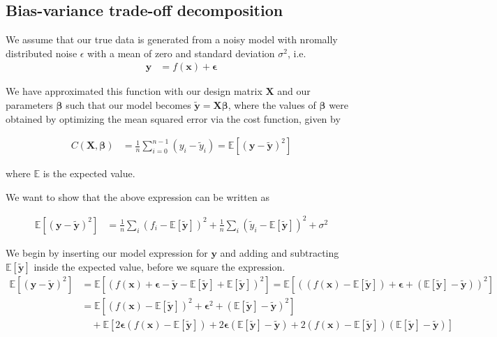 \documentclass[reprint,english,notitlepage,aps,nobalancelastpage,nofootinbib]{revtex4-1}  %
\newcommand{\expy}{\mathbb{E}[\mathbf{\tilde{y}}]}
\newcommand{\closed}[1]{\left({#1}\right)}
\newcommand{\bracket}[1]{\left[{#1}\right]}
\begin{document}
\subsection*{Bias-variance trade-off decomposition}
We assume that our true data is generated from a noisy model with nromally distributed noise $\epsilon$ with a mean of zero and standard deviation $\sigma^2$, i.e.
\begin{align*}
  \mathbf{y} &= f(\mathbf{x}) + \bm{\epsilon}
\end{align*}

We have approximated this function with our design matrix $\mathbf{X}$ and our parameters $\bm{\beta}$ such that our model becomes $\mathbf{\tilde{y}}=\mathbf{X}\bm{\beta}$, where the values of $\bm{\beta}$ were obtained by optimizing the mean squared error via the cost function, given by

\begin{align*}
  C(\mathbf{X}, \bm{\beta}) &= \frac{1}{n} \sum_{i=0}^{n-1} (y_i - \tilde{y}_i) = \mathbb{E}\left[(\mathbf{y} - \mathbf{\tilde{y}})^2\right]
\end{align*}

where $\mathbb{E}$ is the expected value. %

We want to show that the above expression can be written as

\begin{align*}
  \mathbb{E}\left[(\mathbf{y} - \mathbf{\tilde{y}})^2\right] &= \frac{1}{n} \sum_i (f_i - \expy)^2 + \frac{1}{n}\sum_i (\tilde{y}_i - \expy )^2 + \sigma^2
\end{align*}

We begin by inserting our model expression for $\mathbf{y}$ and adding and subtracting $\expy$ inside the expected value, before we square the expression.
\begin{align*}
  \mathbb{E}\bracket{(\mathbf{y} - \mathbf{\tilde{y}})^2} &= \mathbb{E}\bracket{(f(\mathbf{x}) + \bm{\epsilon} - \mathbf{\tilde{y}} - \expy + \expy)^2} = \mathbb{E}\bracket{\closed{(f(\mathbf{x}) - \expy) + \bm{\epsilon} + (\expy - \mathbf{\tilde{y}}) }^2 } \\
  &= \mathbb{E}\bracket{(f(\mathbf{x}) - \expy)^2 + \bm{\epsilon}^2 + (\expy - \mathbf{\tilde{y}})^2} \\
  &\quad+ \mathbb{E}\bracket{2\bm{\epsilon} (f(\mathbf{x}) - \expy) + 2\bm{\epsilon}(\expy - \mathbf{\tilde{y}}) + 2 (f(\mathbf{x}) - \expy)(\expy - \mathbf{\tilde{y}})}
\end{align*}
\end{document}
